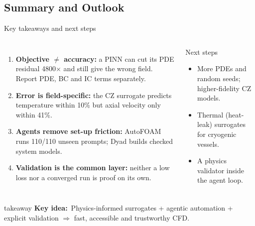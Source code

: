 \documentclass[aspectratio=169,10pt,t]{beamer}
\newcommand{\key}[1]{\textcolor{qblue}{\textbf{#1}}}
\newcommand{\takeaway}[1]{%
  \par\vfill
  \begin{beamercolorbox}[wd=\linewidth,sep=5pt,rounded=true]{takeaway}
    \small\textcolor{qblue}{\textbf{Key idea:}}~#1
  \end{beamercolorbox}\vspace{1mm}}
\begin{document}
\begin{frame}
\section{Summary and Outlook}
\begin{frame}{Key takeaways and next steps}
\begin{columns}[T,onlytextwidth]
\begin{enumerate}\small\setlength{\itemsep}{3pt}
  \item \key{Objective $\neq$ accuracy:} a PINN can cut its PDE residual 4800$\times$ and still give the wrong field. Report PDE, BC and IC terms separately.
  \item \key{Error is field-specific:} the CZ surrogate predicts temperature within 10\% but axial velocity only within 41\%.
  \item \key{Agents remove set-up friction:} AutoFOAM runs 110/110 unseen prompts; Dyad builds checked system models.
  \item \key{Validation is the common layer:} neither a low loss nor a converged run is proof on its own.
\end{enumerate}
\begin{block}{Next steps}
\begin{itemize}\small
  \item More PDEs and random seeds; higher-fidelity CZ models.
  \item Thermal (heat-leak) surrogates for cryogenic vessels.
  \item A physics validator inside the agent loop.
\end{itemize}
\end{block}
\end{columns}
\takeaway{Physics-informed surrogates + agentic automation + explicit validation $\Rightarrow$ fast, accessible and trustworthy CFD.}
\end{frame}


\end{frame}
\end{document}
